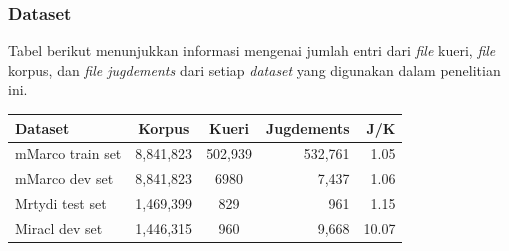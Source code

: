 \documentclass[10pt]{beamer}
\newcommand{\f}[1]{\textit{#1}}
\begin{document}
\begin{frame}
    \frametitle{Dataset}

    Tabel berikut menunjukkan informasi mengenai jumlah entri dari \f{file} kueri, \f{file} korpus, dan \f{file jugdements} dari setiap \f{dataset} yang digunakan dalam penelitian ini.
    \begin{table}[!ht]
        \centering
        \begin{tabular}{|l|c|c|r|r|} \hline
            \textbf{Dataset} & \textbf{Korpus} & \textbf{Kueri} & \textbf{Jugdements} & \textbf{J/K} \\ \hline
            mMarco train set & 8,841,823       & 502,939        & 532,761             & 1.05                         \\ \hline
            mMarco dev set   & 8,841,823       & 6980           & 7,437               & 1.06                         \\ \hline
            Mrtydi test set  & 1,469,399       & 829            & 961                 & 1.15                        \\ \hline
            Miracl dev set   & 1,446,315       & 960            & 9,668               & 10.07                       \\ \hline
        \end{tabular}
    \end{table}    
\end{frame}
\end{document}
